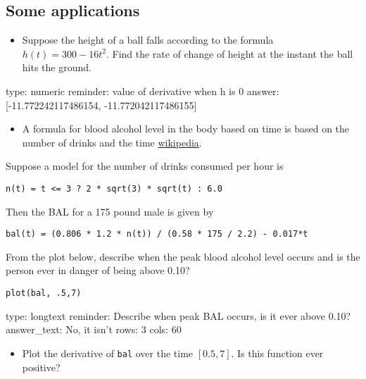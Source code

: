 \documentclass[12pt]{article}
\begin{document}
\subsection{Some applications}

\begin{itemize}
\itemsep1pt\parskip0pt
\item
  Suppose the height of a ball falls according to the formula
  $h(t) =   300 - 16t^2$. Find the rate of change of height at the
  instant the ball hits the ground.
\end{itemize}

\begin{answer}
    type: numeric
    reminder: value of derivative when h is 0
    answer: [-11.772242117486154, -11.772042117486155]

\end{answer}

\begin{itemize}
\itemsep1pt\parskip0pt
\item
  A formula for blood alcohol level in the body based on time is based
  on the number of drinks and the time
  \href{http://en.wikipedia.org/wiki/Blood_alcohol_content}{wikipedia}.
\end{itemize}

Suppose a model for the number of drinks consumed per hour is



\begin{verbatim}
n(t) = t <= 3 ? 2 * sqrt(3) * sqrt(t) : 6.0
\end{verbatim}
Then the BAL for a 175 pound male is given by



\begin{verbatim}
bal(t) = (0.806 * 1.2 * n(t)) / (0.58 * 175 / 2.2) - 0.017*t
\end{verbatim}
From the plot below, describe when the peak blood alcohol level occurs
and is the person ever in danger of being above 0.10?



\begin{verbatim}
plot(bal, .5,7)
\end{verbatim}
\begin{answer}
type: longtext
reminder: Describe when peak BAL occurs, is it ever above 0.10?
answer_text: No, it isn't 
rows: 3
cols: 60
\end{answer}

\begin{itemize}
\itemsep1pt\parskip0pt
\item
  Plot the derivative of \texttt{bal} over the time $[0.5, 7]$. Is this
  function ever positive?
\end{itemize}
\end{document}
